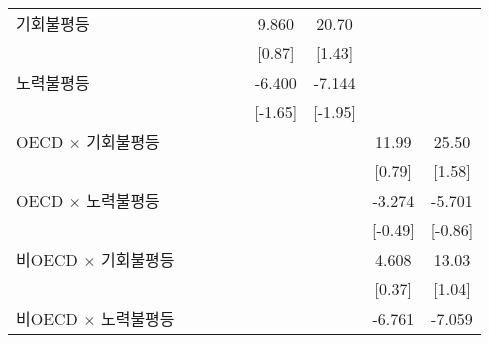 \begin{table}[htbp]
{\begin{tabular}{l*{8}{c}}
\addlinespace
기회불평등        &                     &                     &                     &                     &       9.860         &       20.70         &                     &                     \\
                    &                     &                     &                     &                     &      [0.87]         &      [1.43]         &                     &                     \\
\addlinespace
노력불평등        &                     &                     &                     &                     &      -6.400\sym{*}  &      -7.144\sym{*}  &                     &                     \\
                    &                     &                     &                     &                     &     [-1.65]         &     [-1.95]         &                     &                     \\
\addlinespace
OECD $\times$ 기회불평등&                     &                     &                     &                     &                     &                     &       11.99         &       25.50         \\
                    &                     &                     &                     &                     &                     &                     &      [0.79]         &      [1.58]         \\
\addlinespace
OECD $\times$ 노력불평등&                     &                     &                     &                     &                     &                     &      -3.274         &      -5.701         \\
                    &                     &                     &                     &                     &                     &                     &     [-0.49]         &     [-0.86]         \\
\addlinespace
비OECD $\times$ 기회불평등&                     &                     &                     &                     &                     &                     &       4.608         &       13.03         \\
                    &                     &                     &                     &                     &                     &                     &      [0.37]         &      [1.04]         \\
\addlinespace
비OECD $\times$ 노력불평등&                     &                     &                     &                     &                     &                     &      -6.761\sym{*}  &      -7.059\sym{*}  \\

\end{tabular}}
\end{table}
